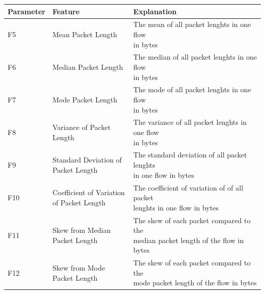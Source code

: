 \begin{center}
\begin{longtable}{ |l|l|l| }
\hline
Parameter & Feature & Explanation \\
\hline
F5 & Mean Packet Length & \makecell{The mean of all packet lenghts in one flow \\ in bytes} \\
\hline
F6 & Median Packet Length & \makecell{The median of all packet lenghts in one flow \\ in bytes} \\
\hline
F7 & Mode Packet Length & \makecell{The mode of all packet lenghts in one flow \\ in bytes} \\
\hline
F8 & Variance of Packet Length & \makecell{The variance of all packet lenghts in one flow \\ in bytes} \\
\hline
F9 & \makecell{Standard Deviation of \\ Packet Length} & \makecell{The standard deviation of all packet lenghts \\ in one flow in bytes} \\
\hline
F10 & \makecell{Coefficient of Variation \\ of Packet Length} & \makecell{The coefficient of variation of of all packet \\ lenghts in one flow in bytes} \\
\hline
F11 & \makecell{Skew from Median \\ Packet Length} & \makecell{The skew of each packet compared to the \\ median packet length of the flow in bytes} \\
\hline
F12 & \makecell{Skew from Mode \\ Packet Length} & \makecell{The skew of each packet compared to the \\ mode packet length of the flow in bytes} \\
\hline
\end{longtable}
 \label{tab:packetLength}
\end{center}

